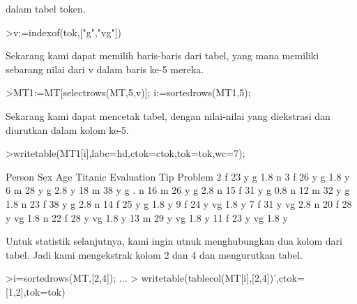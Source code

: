 \documentclass[a4paper,10pt]{article}
\begin{document}
\begin{eulernotebook}
\begin{eulercomment}
dalam tabel token.
\end{eulercomment}
\begin{eulerprompt}
>v:=indexof(tok,["g","vg"])
\end{eulerprompt}
\begin{euleroutput}
  [5,  6]
\end{euleroutput}
\begin{eulercomment}
Sekarang kami dapat memilih baris-baris dari tabel, yang mana memiliki sebarang nilai dari
v dalam baris ke-5 mereka.
\end{eulercomment}
\begin{eulerprompt}
>MT1:=MT[selectrows(MT,5,v)]; i:=sortedrows(MT1,5);
\end{eulerprompt}
\begin{eulercomment}
Sekarang kami dapat mencetak tabel, dengan nilai-nilai yang diekstrasi dan diurutkan dalam
kolom ke-5.
\end{eulercomment}
\begin{eulerprompt}
>writetable(MT1[i],labc=hd,ctok=ctok,tok=tok,wc=7);
\end{eulerprompt}
\begin{euleroutput}
   Person    Sex    Age Titanic Evaluation    Tip Problem
        2      f     23       y          g    1.8       n
        3      f     26       y          g    1.8       y
        6      m     28       y          g    2.8       y
       18      m     38       y          g      .       n
       16      m     26       y          g    2.8       n
       15      f     31       y          g    0.8       n
       12      m     32       y          g    1.8       n
       23      f     38       y          g    2.8       n
       14      f     25       y          g    1.8       y
        9      f     24       y         vg    1.8       y
        7      f     31       y         vg    2.8       n
       20      f     28       y         vg    1.8       n
       22      f     28       y         vg    1.8       y
       13      m     29       y         vg    1.8       y
       11      f     23       y         vg    1.8       y
\end{euleroutput}
\begin{eulercomment}
Untuk statistik selanjutnya, kami ingin utnuk menghubungkan dua kolom dari tabel. Jadi
kami mengekstrak kolom 2 dan 4 dan mengurutkan tabel.
\end{eulercomment}
\begin{eulerprompt}
>i=sortedrows(MT,[2,4]);  ...
>  writetable(tablecol(MT[i],[2,4])',ctok=[1,2],tok=tok)

\end{eulerprompt}
\end{eulernotebook}
\end{document}
